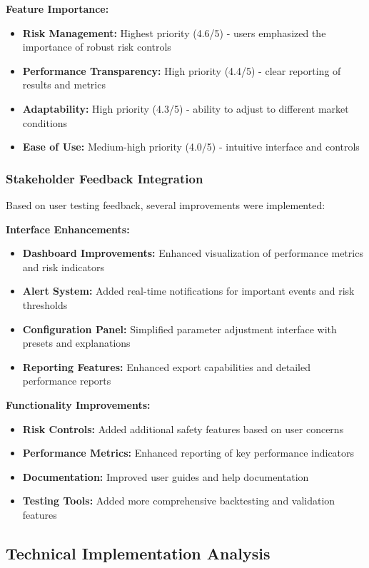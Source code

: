 \documentclass[conference]{IEEEtran}
\begin{document}
\textbf{Feature Importance:}
\begin{itemize}
    \item \textbf{Risk Management:} Highest priority (4.6/5) - users emphasized the importance of robust risk controls
    \item \textbf{Performance Transparency:} High priority (4.4/5) - clear reporting of results and metrics
    \item \textbf{Adaptability:} High priority (4.3/5) - ability to adjust to different market conditions
    \item \textbf{Ease of Use:} Medium-high priority (4.0/5) - intuitive interface and controls
\end{itemize}

\subsubsection{Stakeholder Feedback Integration}
Based on user testing feedback, several improvements were implemented:

\textbf{Interface Enhancements:}
\begin{itemize}
    \item \textbf{Dashboard Improvements:} Enhanced visualization of performance metrics and risk indicators
    \item \textbf{Alert System:} Added real-time notifications for important events and risk thresholds
    \item \textbf{Configuration Panel:} Simplified parameter adjustment interface with presets and explanations
    \item \textbf{Reporting Features:} Enhanced export capabilities and detailed performance reports
\end{itemize}

\textbf{Functionality Improvements:}
\begin{itemize}
    \item \textbf{Risk Controls:} Added additional safety features based on user concerns
    \item \textbf{Performance Metrics:} Enhanced reporting of key performance indicators
    \item \textbf{Documentation:} Improved user guides and help documentation
    \item \textbf{Testing Tools:} Added more comprehensive backtesting and validation features
\end{itemize}

\subsection{Technical Implementation Analysis}
\end{document}
